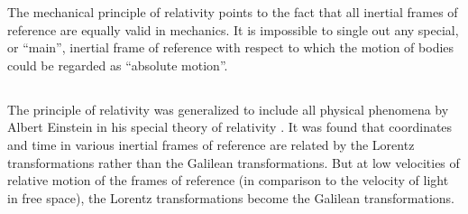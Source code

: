 The mechanical principle of relativity points to the fact that all inertial frames of reference are equally valid in mechanics. It is impossible to single out any special, or ``main'', inertial frame of reference with respect to which the motion of bodies could be regarded as ``absolute motion''.

\subsection{}\label{2.8.5} The principle of relativity was generalized to include all physical phenomena by Albert Einstein in his special theory of relativity . It was found that coordinates and time in various inertial frames of reference are related by the Lorentz transformations  rather than the Galilean transforma­tions. But at low velocities of relative motion of the frames of reference (in comparison to the velocity of light in free space), the Lorentz transformations become the Galilean transforma­tions.
